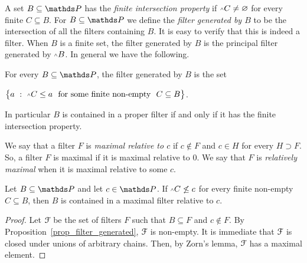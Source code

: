 A set $B\subseteq\PP$ has the \emph{finite intersection property\/} if $\swedge C\neq\varnothing$ for every finite $C\subseteq B$.
For $B\subseteq\PP$ we define the \emph{filter generated by $B$\/} to be the intersection of all the filters containing $B$.
It is easy to verify that this is indeed a filter.
When $B$ is a finite set, the filter generated by $B$ is the principal filter generated by $\swedge B$.
In general we have the following.

\begin{proposition} \label{prop_filter_generated}
For every $B\subseteq \PP$, the filter generated by $B$ is the set

\hfil$\big\{a\ :\ \swedge C\le a\ \textrm{ for some finite non-empty }\ C\subseteq B\big\}$.

In particular $B$ is contained in a proper filter if and only if it has the finite intersection property.
\end{proposition}

We say that a filter $F$ is \emph{maximal relative to $c$\/} if $c\notin F$ and $c\in H$ for every $H\supset F$.
So, a filter $F$ is maximal if it is maximal relative to $0$.
We say that  $F$ is \emph{relatively maximal\/} when it is maximal relative to some $c$.


\begin{proposition}\label{esistenzamassimale2}
Let $B\subseteq \PP$ and let $c\in \PP$.
If $\swedge C\not\le c$ for every finite non-empty $C\subseteq B$, then $B$ is contained in a maximal filter relative to $c$.
\end{proposition}

\begin{proof}
Let $\EuScript F$ be the set of filters $F$ such that $B\subseteq F$ and $c\notin F$.
By Proposition~\ref{prop_filter_generated}, $\EuScript F$ is non-empty.
It is immediate that $\EuScript F$ is closed under unions of arbitrary chains.
Then, by Zorn's lemma, $\EuScript F$ has a maximal element.
\end{proof}


